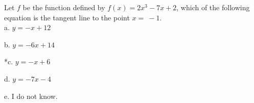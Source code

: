 
Let \( f \) be the function defined by \( f(x) = 2x^{3} - 7x + 2 \), which of the following equation is the tangent line to the point \(x = \  - 1\).\\

a. \( y = - x + 12 \)

b. \( y = - 6x + 14 \)

*c. \( y = - x + 6 \)

d. \( y = - 7x - 4 \)

e. I do not know.\\
